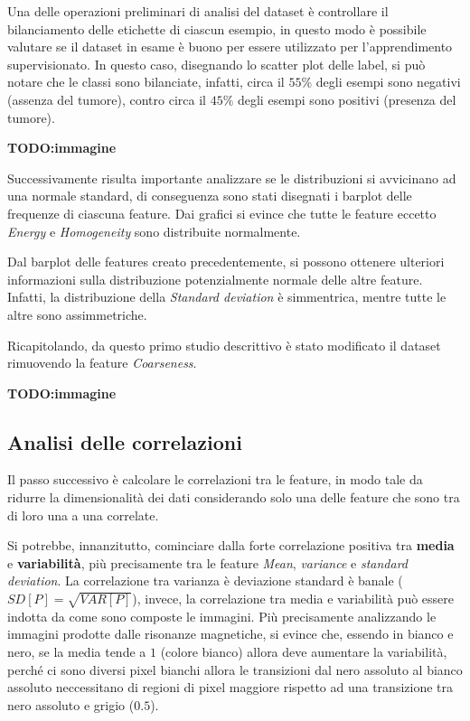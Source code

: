 Una delle operazioni preliminari di analisi del dataset è controllare il bilanciamento
delle etichette di ciascun esempio, in questo modo è possibile valutare se il
dataset in esame è buono per essere utilizzato per l'apprendimento supervisionato.
In questo caso, disegnando lo scatter plot delle label, si può notare che le classi
sono bilanciate, infatti, circa il $55\%$ degli esempi sono negativi (assenza del tumore),
contro circa il $45\%$ degli esempi sono positivi (presenza del tumore).

\textbf{TODO:immagine}

Successivamente risulta importante analizzare se le distribuzioni si avvicinano 
ad una normale standard, di conseguenza sono stati disegnati i barplot delle frequenze
di ciascuna feature. Dai grafici si evince che tutte le feature eccetto \textit{Energy} e
\textit{Homogeneity} sono distribuite normalmente. 

Dal barplot delle features creato precedentemente, si possono ottenere ulteriori
informazioni sulla distribuzione potenzialmente normale delle altre feature. Infatti,
la distribuzione della \textit{Standard deviation} è simmentrica, mentre tutte 
le altre sono assimmetriche.

Ricapitolando, da questo primo studio descrittivo è stato modificato il dataset
rimuovendo la feature \textit{Coarseness}.

\textbf{TODO:immagine}

\subsection{Analisi delle correlazioni}
Il passo successivo è calcolare le correlazioni tra le feature, in modo tale da
ridurre la dimensionalità dei dati considerando solo una delle feature che sono 
tra di loro una a una correlate.
 
Si potrebbe, innanzitutto, cominciare dalla forte correlazione positiva
tra \textbf{media} e \textbf{variabilità}, più precisamente tra le feature \textit{Mean},
\textit{variance} e \textit{standard deviation}. La correlazione tra varianza è 
deviazione standard è banale ($SD[P] = \sqrt{VAR[P]}$), invece, la correlazione tra media 
e variabilità può essere indotta da come sono composte le immagini. Più precisamente 
analizzando le immagini prodotte dalle risonanze magnetiche, si evince che, essendo in 
bianco e nero, se la media tende a $1$ (colore bianco) allora deve aumentare la 
variabilità, perché ci sono diversi pixel bianchi allora le transizioni dal nero assoluto
al bianco assoluto neccessitano di regioni di pixel maggiore rispetto ad una 
transizione tra nero assoluto e grigio ($0.5$). 

